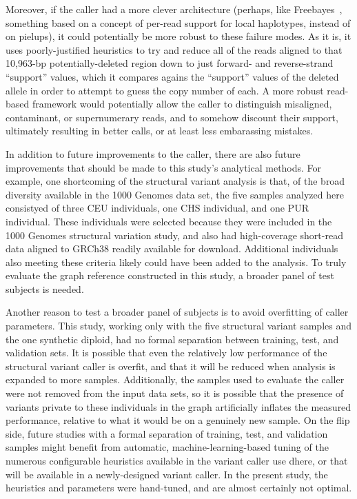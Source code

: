 Moreover, if the caller had a more clever architecture (perhaps, like Freebayes~\cite{garrison2012haplotype}, something based on a concept of per-read support for local haplotypes, instead of on pielups), it could potentially be more robust to these failure modes. As it is, it uses poorly-justified heuristics to try and reduce all of the reads aligned to that 10,963-bp potentially-deleted region down to just forward- and reverse-strand ``support'' values, which it compares agains the ``support'' values of the deleted allele in order to attempt to guess the copy number of each. A more robust read-based framework would potentially allow the caller to distinguish misaligned, contaminant, or supernumerary reads, and to somehow discount their support, ultimately resulting in better calls, or at least less embarassing mistakes.

In addition to future improvements to the caller, there are also future improvements that should be made to this study's analytical methods. For example, one shortcoming of the structural variant analysis is that, of the broad diversity available in the 1000 Genomes data set, the five samples analyzed here consistyed of three CEU individuals, one CHS individual, and one PUR individual. These individuals were selected because they were included in the 1000 Genomes structural variation study, and also had high-coverage short-read data aligned to GRCh38 readily available for download. Additional individuals also meeting these criteria likely could have been added to the analysis. To truly evaluate the graph reference constructed in this study, a broader panel of test subjects is needed.

Another reason to test a broader panel of subjects is to avoid overfitting of caller parameters. This study, working only with the five structural variant samples and the one synthetic diploid, had no formal separation between training, test, and validation sets. It is possible that even the relatively low performance of the structural variant caller is overfit, and that it will be reduced when analysis is expanded to more samples. Additionally, the samples used to evaluate the caller were not removed from the input data sets, so it is possible that the presence of variants private to these individuals in the graph artificially inflates the measured performance, relative to what it would be on a genuinely new sample. On the flip side, future studies with a formal separation of training, test, and validation samples might benefit from automatic, machine-learning-based tuning of the numerous configurable heuristics available in the variant caller use dhere, or that will be available in a newly-designed variant caller. In the present study, the heuristics and parameters were hand-tuned, and are almost certainly not optimal.

